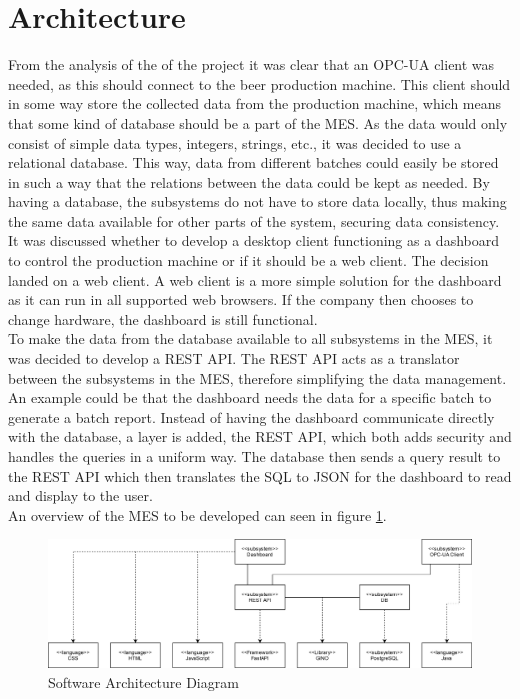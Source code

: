 \section{Architecture}
From the analysis of the of the project it was clear that an OPC-UA
client was needed, as this should connect to the beer production machine. This
client should in some way store the collected data from the production machine,
which means that some kind of database should be a part of the MES. As the data
would only consist of simple data types, integers, strings, etc., it was decided
to use a relational database. This way, data from different batches could easily
be stored in such a way that the relations between the data could be kept as
needed. By having a database, the subsystems do not have to store data
locally, thus making the same data available for other parts of the system,
securing data consistency. \\

It was discussed whether to develop a desktop client functioning as a dashboard
to control the production machine or if it should be a web client. The decision
landed on a web client. A web client is a more simple solution for the dashboard
as it can run in all supported web browsers. If the company then chooses to
change hardware, the dashboard is still functional. \\
 

To make the data from the database available to all subsystems in the MES, 
it was decided to develop a REST API. The REST API acts as a translator
between the subsystems in the MES, therefore simplifying the data management.
An example could be that the dashboard needs the data for a specific batch to
generate a batch report. Instead of having the dashboard communicate directly
with the database, a layer is added, the REST API, which both adds security and
handles the queries in a uniform way. The database then sends a query result to
the REST API which then translates the SQL to JSON for the dashboard to read
and display to the user. \\

An overview of the MES to be developed can seen in figure
\ref{figure:architucture_diagram}.

\begin{figure}[ht]
	\centering 
	\includegraphics[scale=0.24]{images/diagrams/architecture_diagram.png}
	\caption{Software Architecture Diagram}
	\label{figure:architucture_diagram} 
\end{figure}

